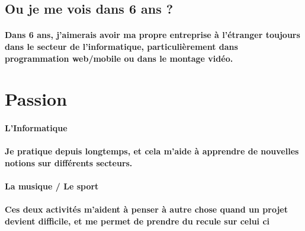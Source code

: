 \documentclass{article}
\begin{document}
\subsection{Ou je me vois dans 6 ans ?}
\paragraph{Dans 6 ans, j'aimerais avoir ma propre entreprise à l'étranger toujours dans le secteur de l'informatique,
 particulièrement dans programmation web/mobile ou dans le montage vidéo.}

\section{Passion}
\paragraph{L'Informatique}
\paragraph{Je pratique depuis longtemps, et cela m'aide à apprendre de nouvelles notions sur différents secteurs. }
\paragraph{La musique / Le sport}
\paragraph{Ces deux activités m'aident à penser à autre chose quand un projet devient difficile, et me permet de prendre du recule sur celui ci }
\end{document}
